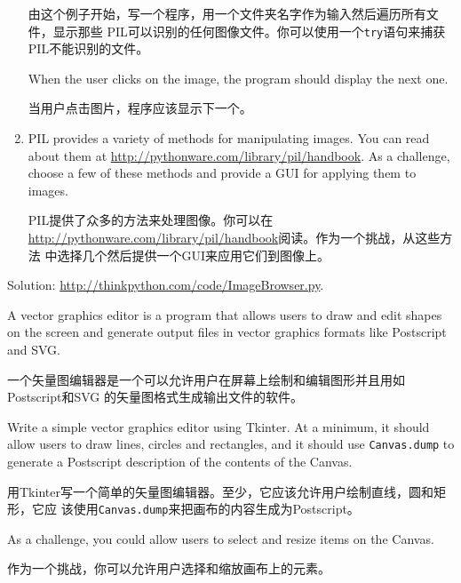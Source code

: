 \documentclass[10pt]{book}
\begin{document}
\begin{CJK}{UTF8}{gbsn}
\begin{exercise}
\begin{enumerate}
由这个例子开始，写一个程序，用一个文件夹名字作为输入然后遍历所有文件，显示那些
PIL可以识别的任何图像文件。你可以使用一个{\tt try}语句来捕获PIL不能识别的文件。

When the user clicks on the image, the program should display the next one.

当用户点击图片，程序应该显示下一个。

\item PIL provides a variety of methods for manipulating images.
You can read about them at \url{http://pythonware.com/library/pil/handbook}.
As a challenge, choose a few of these methods and provide a
GUI for applying them to images.

PIL提供了众多的方法来处理图像。你可以在
\url{http://pythonware.com/library/pil/handbook}阅读。作为一个挑战，从这些方法
中选择几个然后提供一个GUI来应用它们到图像上。

\end{enumerate}

Solution: \url{http://thinkpython.com/code/ImageBrowser.py}.

\end{exercise}


\begin{exercise}

A vector graphics editor is a program that allows users to draw and
edit shapes on the screen and generate output files in vector graphics
formats like Postscript and SVG.

一个矢量图编辑器是一个可以允许用户在屏幕上绘制和编辑图形并且用如Postscript和SVG
的矢量图格式生成输出文件的软件。

Write a simple vector graphics editor using Tkinter.  At a
minimum, it should allow users to draw lines, circles and
rectangles, and it should use {\tt Canvas.dump} to
generate a Postscript description of the contents of the
Canvas.

用Tkinter写一个简单的矢量图编辑器。至少，它应该允许用户绘制直线，圆和矩形，它应
该使用{\tt Canvas.dump}来把画布的内容生成为Postscript。

As a challenge, you could allow users to select and resize
items on the Canvas.

作为一个挑战，你可以允许用户选择和缩放画布上的元素。


\end{exercise}


\begin{exercise}


\end{exercise}
\end{CJK}
\end{document}
